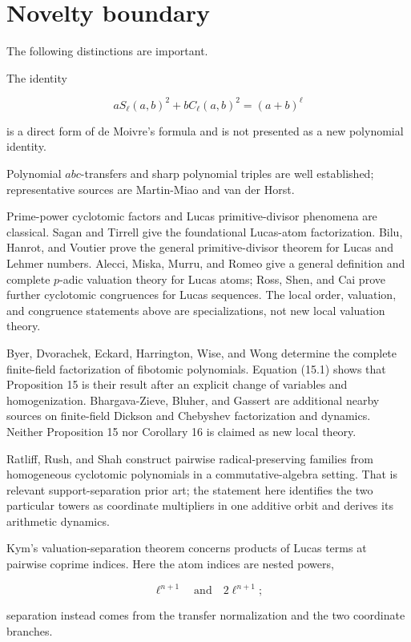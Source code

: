\documentclass[11pt]{article}
\begin{document}
\section{Novelty boundary}

The following distinctions are important.

The identity

\[
aS_\ell(a,b)^2+bC_\ell(a,b)^2=(a+b)^\ell
\]

is a direct form of de Moivre's formula and is not presented as a new
polynomial identity.

Polynomial \(abc\)-transfers and sharp polynomial triples are well
established; representative sources are Martin-Miao and van der Horst.

Prime-power cyclotomic factors and Lucas primitive-divisor phenomena are
classical. Sagan and Tirrell give the foundational Lucas-atom
factorization. Bilu, Hanrot, and Voutier prove the general
primitive-divisor theorem for Lucas and Lehmer numbers. Alecci, Miska,
Murru, and Romeo give a general definition and complete \(p\)-adic
valuation theory for Lucas atoms; Ross, Shen, and Cai prove further
cyclotomic congruences for Lucas sequences. The local order, valuation,
and congruence statements above are specializations, not new local
valuation theory.

Byer, Dvorachek, Eckard, Harrington, Wise, and Wong determine the complete
finite-field factorization of fibotomic polynomials. Equation (15.1)
shows that Proposition 15 is their result after an explicit change of
variables and homogenization. Bhargava-Zieve, Bluher, and Gassert are
additional nearby sources on finite-field Dickson and Chebyshev
factorization and dynamics. Neither Proposition 15 nor Corollary 16 is
claimed as new local theory.

Ratliff, Rush, and Shah construct pairwise radical-preserving families from
homogeneous cyclotomic polynomials in a commutative-algebra setting. That is
relevant support-separation prior art; the statement here identifies the
two particular towers as coordinate multipliers in one additive orbit and
derives its arithmetic dynamics.

Kym's valuation-separation theorem concerns products of Lucas terms at
pairwise coprime indices. Here the atom indices are nested powers,

\[
\ell^{n+1}
\quad\text{and}\quad
2\ell^{n+1};
\]

separation instead comes from the transfer normalization and the two
coordinate branches.
\end{document}
